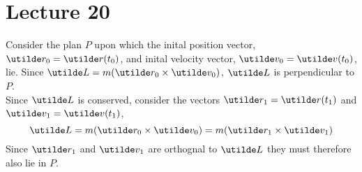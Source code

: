 \documentclass{report}
\begin{document}
\section{Lecture 20}
Consider the plan $P$ upon which the inital position vector, $\ut{r}_0=\ut{r}(t_0)$, and inital velocity vector, $\ut{v}_0=\ut{v}(t_0)$, lie. Since $\ut{L} = m(\ut{r_0}\times\ut{v_0})$, $\ut{L}$ is perpendicular to $P$. \\

Since $\ut{L}$ is conserved, consider the vectors $\ut{r}_1=\ut{r}(t_1)$ and $\ut{v}_1=\ut{v}(t_1)$,
$$
	\ut{L} = m(\ut{r}_0\times\ut{v}_0) = m(\ut{r}_1\times\ut{v}_1)
$$
Since $\ut{r}_1$ and $\ut{v}_1$ are orthognal to $\ut{L}$ they must therefore also lie in $P$.
\end{document}
